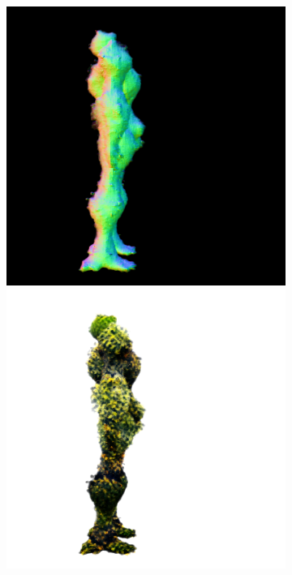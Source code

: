 \begin{figure}[ht]
\begin{subfigure}[b]{0.222\textwidth}
        \caption{}
    \end{subfigure}
    \begin{subfigure}[b]{0.222\textwidth}
        \centering
        \fontsize{9pt}{7pt}\selectfont{}\vspace{.1cm}
        \includegraphics[width=\textwidth]{figures/appendix/magic123_coarse_robot_right_5000_part2.png}
        \includegraphics[width=\textwidth]{figures/appendix/magic123_coarse_robot_right_5000_part1.png}

\end{subfigure}
\end{figure}
